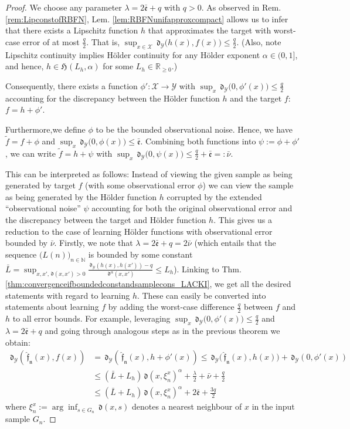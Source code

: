 \documentclass{article} %
\theoremstyle{definition}
\theoremstyle{remark}
\newcommand{\Real}{\mathbb R}
\newcommand{\nat}{\mathbb N}
\newcommand{\inspace}{\ensuremath{ \mathcal X}}
\newcommand{\outspace}{\ensuremath{ \mathcal Y}}
\newcommand{\grid}{\ensuremath{  G}}
\newcommand{\metric}{\, \mathfrak{d}} %
\newcommand{\Metrico}[2]{\metric_\outspace\bigl(#1,#2\bigr) }
\newcommand{\predfn}{\, \mathfrak{  \hat f_n}} %
\newcommand{\hexp}{{ \alpha }}%
\newcommand{\hestthresh}{\ensuremath{ \lambda}}
\newcommand{\hoelset}[3]{\mathfrak{H}_{#2}(#1,#3)}
\newcommand{\obserrbnd}{\bar{\mathfrak e}}
\newcommand{\seq}[2]{\ensuremath{\bigl(#1\bigr)_{#2}}}
\begin{document}
\begin{proof}
We choose any parameter $\hestthresh =  2 \obserrbnd + q$ with $q >0$. As observed in Rem. \ref{rem:LipconstofRBFN}, Lem. \ref{lem:RBFNunifapproxcompact} allows us to infer that there exists a Lipschitz function $h$ that approximates the target with worst-case error of at most $\frac q 2$. That is, $\sup_{x \in \inspace} \metric_\outspace\bigl(h(x), f(x) \bigr) \leq \frac q 2$. (Also, note Lipschitz continuity implies H\"older continuity for any H\"older exponent $\hexp \in (0,1]$, and hence, $h \in \hoelset {L_h}{ }{\hexp}$ for some $ L_h \in \Real_{\geq 0}$.)

Consequently, there exists a function $\phi':\inspace \to \outspace$ with $\sup_x \Metrico{ 0}{\phi'(x) } \leq \frac q 2$ accounting for the discrepancy between the H\"older function $h$ and the target $f$: $f = h+ \phi'$. 

Furthermore,we define $\phi$ to be the bounded observational noise. Hence, we have $\tilde f = f+ \phi$ and $\sup_x \Metrico{0}{\phi(x)} \leq \obserrbnd$.
Combining both functions into $\psi := \phi+\phi'$, we can write $\tilde f = h + \psi$ with $\sup_x \Metrico{0}{\psi(x)}\leq \frac q 2 + \obserrbnd =: \bar \nu$.

This can be interpreted as follows:
Instead of viewing the given sample as being generated by target $f$ (with some observational error $\phi$) we can view the sample as being generated by the H\"older function $h$ corrupted by the extended ``observational noise'' $\psi$ accounting for both the original observational error and the discrepancy between the target and H\"older function $h$.
This gives us a reduction to the case of learning H\"older functions with observational error bounded by $\bar \nu$. Firstly, we note that $\hestthresh = 2 \obserrbnd +q =2 \bar \nu$ (which entails that the sequence $\seq{L(n)}{n \in \nat}$ is bounded by some constant $\bar L  =\sup_{x,x', \metric(x,x') >0} \frac{\metric_\outspace(h(x), h(x'))   -q}{\metric^\hexp(x,x')} \leq L_h$). 
Linking to Thm. \ref{thm:convergenceifboundedconstandsamplecons_LACKI}, we get all the desired statements with regard to learning $h$. These can easily be converted into statements about learning $f$ by adding the worst-case difference $\frac q 2$ between $f$ and $h$ to all error bounds. 
For example, leveraging $\sup_x \Metrico{ 0}{\phi'(x) } \leq \frac q 2$ and $\lambda = 2 \obserrbnd + q$ and going through analogous steps as in the previous theorem we obtain:   
\begin{align}
\metric_\outspace(\predfn(x), f(x) ) &= \metric_\outspace(\predfn(x), h+\phi' (x) ) 
\leq   \metric_\outspace\bigl(\predfn(x) , h(x)\bigr) + \metric_\outspace(0,\phi'(x) ) \\
&\leq (\bar L+ L_h) \metric(x,\xi_n^x )^\hexp + \frac \lambda 2 +\bar \nu + \frac q 2 \\
&\leq (\bar L+ L_h) \metric(x,\xi_n^x )^\hexp  +2 \obserrbnd + \frac {3q}{2} \label{ineq:euyiweeh}
\end{align}
where  $\xi^x_n := \arg\inf_{s \in \grid_n} \metric(x,s)$ denotes a nearest neighbour of $x$ in the input sample $\grid_n$.


\end{proof}
\end{document}
